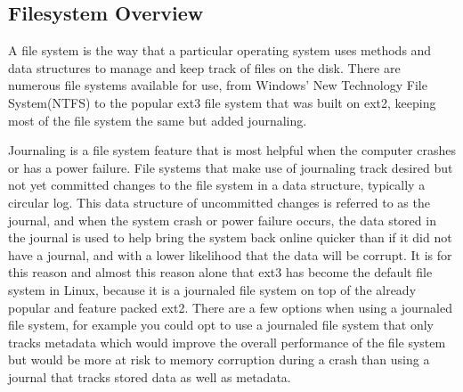 \documentclass[10pt,serif,draftclsnofoot,onecolumn]{IEEEtran}
\begin{document}
	\subsection{Filesystem Overview}
	\par
	A file system is the way that a particular operating system uses methods and data structures to manage and keep track of files on the disk\cite{14}. There are numerous file systems available for use, from Windows' New Technology File System(NTFS) to the popular ext3 file system that was built on ext2, keeping most of the file system the same but added journaling.
	\newline
	\par
	Journaling is a file system feature that is most helpful when the computer crashes or has a power failure. File systems that make use of journaling track desired but not  yet committed changes to the file system in a data structure, typically a circular log\cite{15}. This data structure of uncommitted changes is referred to as the journal, and when the system crash or power failure occurs, the data stored in the journal is used to help bring the system back online quicker than if it did not have a journal, and with a lower likelihood that the data will be corrupt. It is for this reason and almost this reason alone that ext3 has become the default file system in Linux, because it is a journaled file system on top of the already popular and feature packed ext2\cite{14}. There are a few options when using a journaled file system, for example you could opt to use a journaled file system that only tracks metadata which would improve the overall performance of the file system but would be more at risk to memory corruption during a crash than using a journal that tracks stored data as well as metadata.
	\newline
\end{document}
